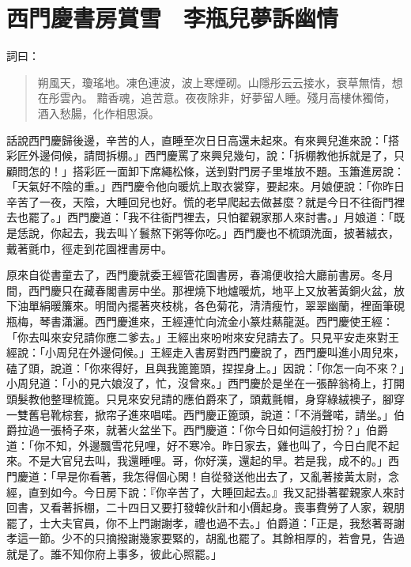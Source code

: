 
\chapter{西門慶書房賞雪　李瓶兒夢訴幽情}

詞曰：
\begin{quote}
朔風天，瓊瑤地。凍色連波，波上寒煙砌。山隱彤云云接水，衰草無情，想在彤雲內。
黯香魂，追苦意。夜夜除非，好夢留人睡。殘月高樓休獨倚，酒入愁腸，化作相思淚。
\end{quote}

話說西門慶歸後邊，辛苦的人，直睡至次日日高還未起來。有來興兒進來說：「搭彩匠外邊伺候，請問拆棚。」西門慶罵了來興兒幾句，說：「拆棚教他拆就是了，只顧問怎的！」搭彩匠一面卸下席繩松條，送到對門房子里堆放不題。玉簫進房說：「天氣好不陰的重。」西門慶令他向暖炕上取衣裳穿，要起來。月娘便說：「你昨日辛苦了一夜，天陰，大睡回兒也好。慌的老早爬起去做甚麼？就是今日不往衙門裡去也罷了。」西門慶道：「我不往衙門裡去，只怕翟親家那人來討書。」月娘道：「既是恁說，你起去，我去叫丫鬟熬下粥等你吃。」西門慶也不梳頭洗面，披著絨衣，戴著氈巾，徑走到花園裡書房中。

原來自從書童去了，西門慶就委王經管花園書房，春鴻便收拾大廳前書房。冬月間，西門慶只在藏春閣書房中坐。那裡燒下地爐暖炕，地平上又放著黃銅火盆，放下油單絹暖簾來。明間內擺著夾枝桃，各色菊花，清清瘦竹，翠翠幽蘭，裡面筆硯瓶梅，琴書瀟灑。西門慶進來，王經連忙向流金小篆炷爇龍涎。西門慶使王經：「你去叫來安兒請你應二爹去。」王經出來吩咐來安兒請去了。只見平安走來對王經說：「小周兒在外邊伺候。」王經走入書房對西門慶說了，西門慶叫進小周兒來，磕了頭，說道：「你來得好，且與我篦篦頭，捏捏身上。」因說：「你怎一向不來？」小周兒道：「小的見六娘沒了，忙，沒曾來。」西門慶於是坐在一張醉翁椅上，打開頭髮教他整理梳篦。只見來安兒請的應伯爵來了，頭戴氈帽，身穿綠絨襖子，腳穿一雙舊皂靴棕套，掀帘子進來唱喏。西門慶正篦頭，說道：「不消聲喏，請坐。」伯爵拉過一張椅子來，就著火盆坐下。西門慶道：「你今日如何這般打扮？」伯爵道：「你不知，外邊飄雪花兒哩，好不寒冷。昨日家去，雞也叫了，今日白爬不起來。不是大官兒去叫，我還睡哩。哥，你好漢，還起的早。若是我，成不的。」西門慶道：「早是你看著，我怎得個心閑！自從發送他出去了，又亂著接黃太尉，念經，直到如今。今日房下說：『你辛苦了，大睡回起去。』我又記掛著翟親家人來討回書，又看著拆棚，二十四日又要打發韓伙計和小價起身。喪事費勞了人家，親朋罷了，士大夫官員，你不上門謝謝孝，禮也過不去。」伯爵道：「正是，我愁著哥謝孝這一節。少不的只摘撥謝幾家要緊的，胡亂也罷了。其餘相厚的，若會見，告過就是了。誰不知你府上事多，彼此心照罷。」

